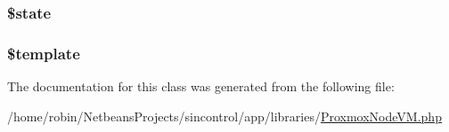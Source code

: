 \subsubsection[{\$state}]{\setlength{\rightskip}{0pt plus 5cm}\$state\hspace{0.3cm}{\ttfamily [private]}}\label{class_proxmox_node_v_m_ae82306c4f2d17d8dd5c7d8d916b33bed}
\hypertarget{class_proxmox_node_v_m_aa3e9534005fd516d941f6a5569896e01}{}
\subsubsection[{\$template}]{\setlength{\rightskip}{0pt plus 5cm}\$template\hspace{0.3cm}{\ttfamily [private]}}\label{class_proxmox_node_v_m_aa3e9534005fd516d941f6a5569896e01}


The documentation for this class was generated from the following file\+:\begin{DoxyCompactItemize}
\item 
/home/robin/\+Netbeans\+Projects/sincontrol/app/libraries/\hyperlink{_proxmox_node_v_m_8php}{Proxmox\+Node\+V\+M.\+php}\end{DoxyCompactItemize}
